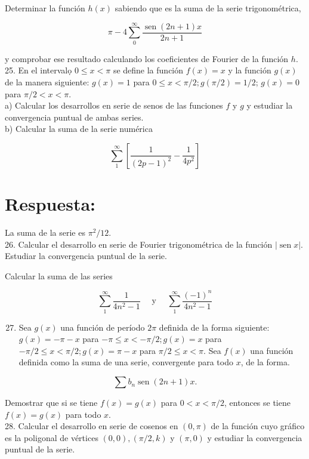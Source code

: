 \documentclass[10pt]{article}
\theoremstyle{plain}
\theoremstyle{definition}
\theoremstyle{remark}
\begin{document}
Determinar la función $h(x)$ sabiendo que es la suma de la serie trigonométrica,

$$
\pi-4 \sum_{0}^{\infty} \frac{\operatorname{sen}(2 n+1) x}{2 n+1}
$$

y comprobar ese resultado calculando los coeficientes de Fourier de la función $h$.\\
25. En el intervalọ $0 \leqslant x<\pi$ se define la función $f(x)=x$ y la función $g(x)$ de la manera siguiente: $g(x)=1$ para $0 \leqslant x<\pi / 2 ; g(\pi / 2)=1 / 2$; $g(x)=0$ para $\pi / 2<x<\pi$.\\
a) Calcular los desarrollos en serie de senos de las funciones $f$ y $g$ y estudiar la convergencia puntual de ambas series.\\
b) Calcular la suma de la serie numérica

$$
\sum_{1}^{\infty}\left[\frac{1}{(2 p-1)^{2}}-\frac{1}{4 p^{2}}\right]
$$

\section*{Respuesta:}
La suma de la serie es $\pi^{2} / 12$.\\
26. Calcular el desarrollo en serie de Fourier trigonométrica de la función $|\operatorname{sen} x|$. Estudiar la convergencia puntual de la serie.

Calcular la suma de las series

$$
\sum_{1}^{\infty} \frac{1}{4 n^{2}-1} \quad \text { y } \quad \sum_{1}^{\infty} \frac{(-1)^{n}}{4 n^{2}-1}
$$

\begin{enumerate}
  \setcounter{enumi}{26}
  \item Sea $g(x)$ una función de período $2 \pi$ definida de la forma siguiente: $g(x)=-\pi-x$ para $-\pi \leqslant x<-\pi / 2 ; g(x)=x$ para $-\pi / 2 \leqslant x<\pi / 2 ; g(x)=\pi-x$ para $\pi / 2 \leqslant x<\pi$. Sea $f(x)$ una función definida como la suma de una serie, convergente para todo $x$, de la forma.
\end{enumerate}

$$
\sum b_{n} \operatorname{sen}(2 n+1) x .
$$

Demostrar que si se tiene $f(x)=g(x)$ para $0<x<\pi / 2$, entonces se tiene $f(x)=g(x)$ para todo $x$.\\
28. Calcular el desarrollo en serie de cosenos en $(0, \pi)$ de la función cuyo gráfico es la poligonal de vértices $(0,0),(\pi / 2, k)$ y $(\pi, 0)$ y estudiar la convergencia puntual de la serie.
\end{document}
